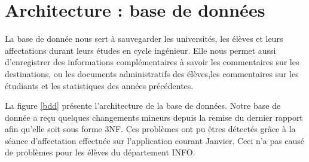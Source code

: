 \chapter{Architecture : base de données}

La base de donnée nous sert à sauvegarder les universités, les élèves et leurs affectations durant leurs études en cycle ingénieur. Elle nous permet aussi d'enregistrer des informations complémentaires à savoir les commentaires sur les destinations, ou les documents administratifs des élèves,les commentaires sur les étudiants et les statistiques des années précédentes.

La figure \ref{bdd} présente l'architecture de la base de données.
\bigbreak
Notre base de donnée a reçu quelques changements mineurs depuis la remise du dernier rapport afin qu'elle soit sous forme 3NF. Ces problèmes ont pu êtres détectés grâce à la séance d'affectation effectuée sur l'application courant Janvier. Ceci n'a pas causé de problèmes pour les élèves du département INFO.

